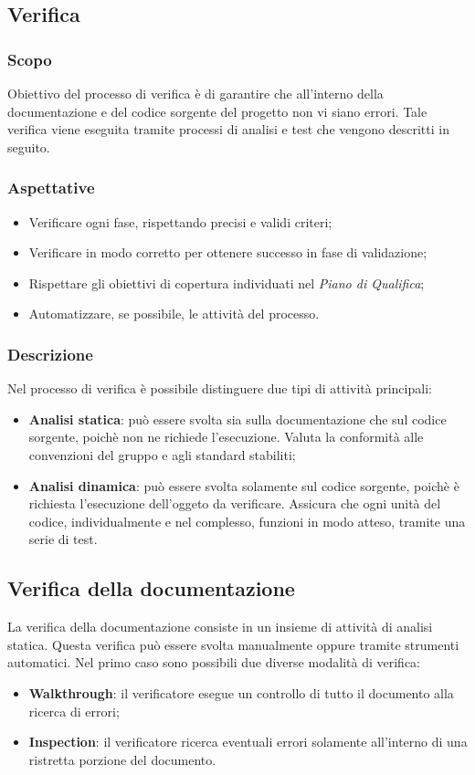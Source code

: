 \documentclass{article}
\begin{document}
\subsection{Verifica}
\subsubsection{Scopo}
Obiettivo del processo di verifica è di garantire che all'interno della documentazione e del codice sorgente del progetto non vi siano errori. Tale verifica viene eseguita tramite processi di analisi e test che vengono descritti in seguito.
\subsubsection{Aspettative}
\begin{itemize}
    \item Verificare ogni fase, rispettando precisi e validi criteri;
    \item Verificare in modo corretto per ottenere successo in fase di validazione;
    \item Rispettare gli obiettivi di copertura individuati nel \textit{Piano di Qualifica};
    \item Automatizzare, se possibile, le attività del processo.
\end{itemize}
\subsubsection{Descrizione}
Nel processo di verifica è possibile distinguere due tipi di attività principali:
\begin{itemize}
    \item \textbf{Analisi statica}: può essere svolta sia sulla documentazione che sul codice sorgente, poichè non ne richiede l'esecuzione. Valuta la conformità alle convenzioni del gruppo e agli standard stabiliti;
    \item \textbf{Analisi dinamica}: può essere svolta solamente sul codice sorgente, poichè è richiesta l'esecuzione dell'oggeto da verificare. Assicura che ogni unità del codice, individualmente e nel complesso, funzioni in modo atteso, tramite una serie di test. 
\end{itemize}
\subsection{Verifica della documentazione}
La verifica della documentazione consiste in un insieme di attività di analisi statica. Questa verifica può essere svolta manualmente oppure tramite strumenti automatici. Nel primo caso sono possibili due diverse modalità di verifica:
\begin{itemize}
    \item \textbf{Walkthrough}: il verificatore esegue un controllo di tutto il documento alla ricerca di errori;
    \item \textbf{Inspection}: il verificatore ricerca eventuali errori solamente all'interno di una ristretta porzione del documento.
\end{itemize}
\end{document}

